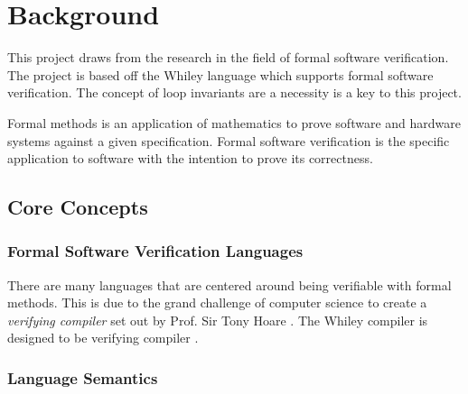 \chapter{Background}\label{C:background}
%


This project draws from the research in the field of formal software verification.
The project is based off the Whiley language which supports formal software
verification. %
The concept of loop invariants are a necessity is a key to this project.

Formal methods is an application of mathematics to prove software and hardware
systems against a given specification. %
Formal software verification is the specific application to software with
the intention to prove its correctness.



\section{Core Concepts}

\subsection{Formal Software Verification Languages}

There are many languages that are centered around being verifiable
with formal methods.
This is due to the grand challenge of computer science
to create a \textit{verifying compiler} set out by Prof. Sir Tony Hoare \cite{Hoare-grand}.
The Whiley compiler is designed to be verifying compiler \cite{whiley-origin}.

\subsection{Language Semantics}

